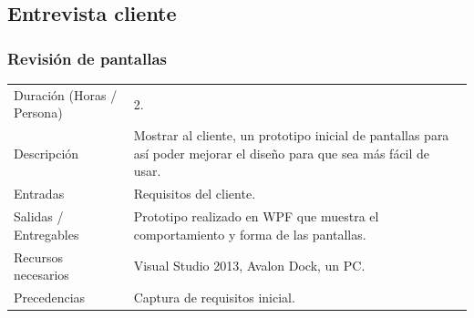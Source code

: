 \subsection{Entrevista cliente}
\subsubsection{Revisi\'{o}n de pantallas}
\begin{table}[H]
    \begin{center}
        \begin{tabular}{l p{8cm}}
            Duraci\'{o}n (Horas / Persona)        & 2. \\ 
            Descripci\'{o}n                       & Mostrar al cliente, un prototipo inicial de pantallas
                                                    para as\'i poder mejorar el dise\~{n}o para que sea m\'as f\'{a}cil de usar. \\
            Entradas                              & Requisitos del cliente. \\
            Salidas / Entregables                 & Prototipo realizado en WPF que muestra el comportamiento y forma de las pantallas. \\
            Recursos necesarios                   & Visual Studio 2013, Avalon Dock, un PC. \\
            Precedencias                          & Captura de requisitos inicial. \\
        \end{tabular}
    \end{center}
    
\end{table}

